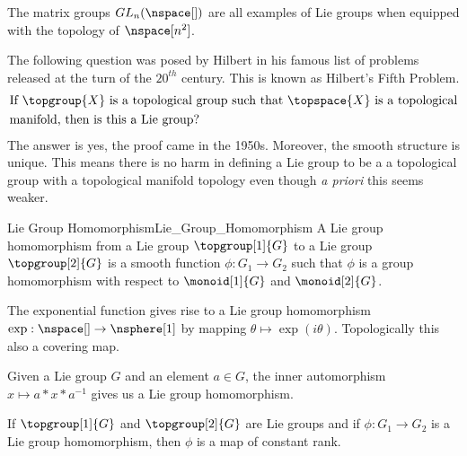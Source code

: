 \documentclass{book}                                                            %
\begin{document}
            \begin{example}
                The matrix groups $GL_{n}(\nspace[])$ are all examples of Lie
                groups when equipped with the topology of $\nspace[n^{2}]$.
            \end{example}
            The following question was posed by Hilbert in his famous list of
            problems released at the turn of the $20^{th}$ century. This is
            known as Hilbert's Fifth Problem.
            \begin{equation}
                \begin{split}
                    &\text{If }\topgroup{X}
                    \text{ is a topological group such that }
                    \topspace{X}\text{ is a topological}\\
                    &\text{manifold, then is this a Lie group?}
                \end{split}
            \end{equation}
            The answer is yes, the proof came in the 1950s. Moreover, the
            smooth structure is unique. This means there is no harm in defining
            a Lie group to be a a topological group with a topological manifold
            topology even though \textit{a priori} this seems weaker.
            \begin{fdefinition}{Lie Group Homomorphism}{Lie_Group_Homomorphism}
                A Lie group homomorphism from a Lie group
                $\topgroup[1]{G}$ to a Lie group $\topgroup[2]{G}$ is a smooth
                function $\phi:G_{1}\rightarrow{G}_{2}$ such that $\phi$ is a
                group homomorphism with respect to $\monoid[1]{G}$ and
                $\monoid[2]{G}$.
            \end{fdefinition}
            \begin{example}
                The exponential function gives rise to a Lie group homomorphism
                $\exp:\nspace[]\rightarrow\nsphere[1]$ by mapping
                $\theta\mapsto\exp(i\theta)$. Topologically this also a covering
                map.
            \end{example}
            \begin{example}
                Given a Lie group $G$ and an element $a\in{G}$, the inner
                automorphism $x\mapsto{a}*x*a^{\minus{1}}$ gives us a Lie group
                homomorphism.
            \end{example}
            \begin{theorem}
                If $\topgroup[1]{G}$ and $\topgroup[2]{G}$ are Lie groups and if
                $\phi:G_{1}\rightarrow{G}_{2}$ is a Lie group homomorphism, then
                $\phi$ is a map of constant rank.
            \end{theorem}
\end{document}
